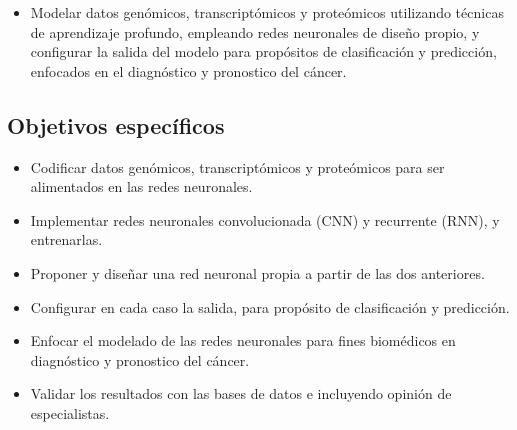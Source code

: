 \begin{itemize}

   \addtolength{\itemsep}{-4mm} %
        \item Modelar datos genómicos, transcriptómicos y proteómicos utilizando técnicas de aprendizaje profundo, empleando redes neuronales de diseño propio, y configurar la salida del modelo para propósitos de clasificación y predicción, enfocados en el diagnóstico y pronostico del cáncer.


    \end{itemize}



\subsection{Objetivos específicos}

\begin{itemize}

   \addtolength{\itemsep}{-4mm} %
        \item Codificar datos genómicos, transcriptómicos y proteómicos para ser alimentados en las redes neuronales.
        \item Implementar redes neuronales convolucionada (CNN) y recurrente (RNN), y entrenarlas.
        \item Proponer y diseñar una red neuronal propia a partir de las dos anteriores.
        \item Configurar en cada caso la salida, para propósito de clasificación y predicción.
        \item Enfocar el modelado de las redes neuronales para fines biomédicos en diagnóstico y pronostico del cáncer.
        \item Validar los resultados con las bases de datos e incluyendo opinión de especialistas.
    \end{itemize}






